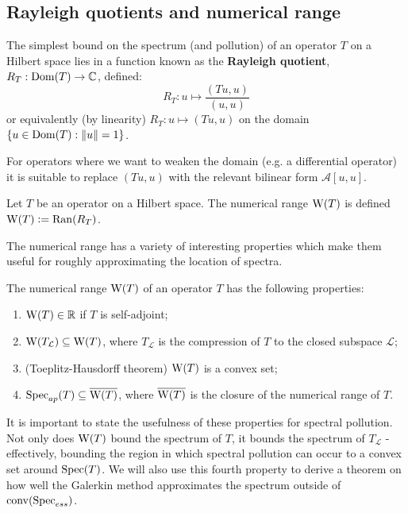 \documentclass[../main.tex]{subfiles}
\begin{document}
\subsection{Rayleigh quotients and numerical range}\label{sec:num-range}
The simplest bound on the spectrum (and pollution) of an operator $T$ on a
Hilbert space lies in a function known as the \textbf{Rayleigh
quotient}, $R_T: \mathrm{Dom}(T) \rightarrow \mathbb{C}$,
defined:
\begin{equation*}
  R_T: u \mapsto \frac{( Tu, u )}{(u, u)}
\end{equation*} 
or equivalently (by linearity) $R_T: u \mapsto (Tu, u)$ on the domain $\{u \in
\mathrm{Dom}(T) : \|u\| = 1\}$.
 
For operators where we want to weaken the domain (e.g. a differential operator)
it is suitable to replace $(Tu, u)$ with the relevant bilinear form
$\mathcal{A}[u, u].$

\begin{definition}
  Let $T$ be an operator on a Hilbert space. The
  numerical range $\mathrm{W}(T)$ is defined $\mathrm{W}(T) \mathrel{\mathop:}= \mathrm{Ran}(R_T)$.
\end{definition}

The numerical range has a variety of interesting properties which make them
useful for roughly approximating the location of spectra.

\begin{proposition}
\label{thm:num-range-props}
  The numerical range $\mathrm{W}(T)$ of an operator $T$ has the following properties:
  \begin{enumerate}
    \item
    \label{item:num-in-R}
	$\mathrm{W}(T) \in \mathbb{R}$ if $T$ is self-adjoint;
    \item
    \label{item:proj-num-range} 
	$\mathrm{W}(T_\mathcal{L}) \subseteq \mathrm{W}(T)$, where $T_\mathcal{L}$ is the compression of $T$ to the closed subspace $\mathcal{L}$;
    \item (Toeplitz-Hausdorff theorem)
    \label{item:toeplitz-hausdorff}
      $\mathrm{W}(T)$ is a convex set;
    \item
    \label{item:spec-in-num} 
      $\mathrm{Spec}_{ap}(T) \subseteq \overline{\mathrm{W}(T)}$,
     where $\overline{\mathrm{W}(T)}$ is the closure of the numerical range of $T$.
  \end{enumerate}
\end{proposition}

It is important to state the usefulness of these properties for spectral
pollution. Not only does $\mathrm{W}(T)$ bound the spectrum of $T$, it bounds the
spectrum of $T_\mathcal{L}$ - effectively, bounding the region in which spectral
pollution can occur to a convex set around $\mathrm{Spec}(T)$.
We will also use this fourth property to derive a theorem on how well the
Galerkin method approximates the spectrum outside of $\mathrm{conv}(\mathrm{Spec}_{ess})$.
\end{document}

